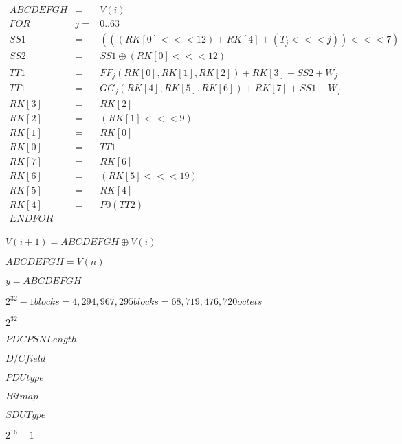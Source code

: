 \documentclass{article}
\begin{document}
\begin{eqnarray*}

 ABCDEFGH &=& V(i) \\

 FOR & j= &0..63 \\

 SS1 &=& (((RK[0] <<< 12) + RK[4] + (T_j <<< j)) <<< 7) \\

 SS2 &=& SS1 \oplus (RK[0] <<< 12) \\

 TT1 &=& FF_j(RK[0], RK[1], RK[2]) + RK[3] + SS2 + {W}^{'}_j \\

 TT1 &=& GG_j(RK[4], RK[5], RK[6]) + RK[7] + SS1 + W_j \\

 RK[3] &=& RK[2] \\

 RK[2] &=& (RK[1] <<< 9) \\

 RK[1] &=& RK[0] \\

 RK[0] &=& TT1 \\

 RK[7] &=& RK[6] \\

 RK[6] &=& (RK[5] <<< 19) \\

 RK[5] &=& RK[4] \\

 RK[4] &=& P0(TT2) \\

 ENDFOR \\
 \end{eqnarray*}
\pagebreak

$ V(i+1) = ABCDEFGH \oplus V(i)$
\pagebreak

$ ABCDEFGH = V(n)$
\pagebreak

$ y=ABCDEFGH$
\pagebreak

$ {2}^{32}-1 blocks = 4,294,967,295 blocks = 68,719,476,720 octets $
\pagebreak

${2}^{32}$
\pagebreak

$ PDCP SN Length$
\pagebreak

$ D/C field$
\pagebreak

$ PDU type$
\pagebreak

$ Bitmap$
\pagebreak

$ SDU Type$
\pagebreak

${2}^{16}-1$
\pagebreak
\end{document}
